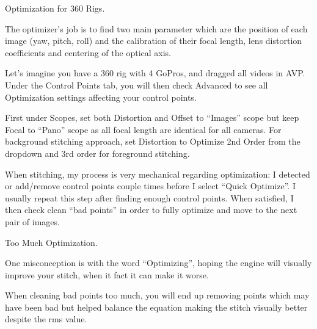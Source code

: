 \begin{fullwidth}
\clearpage
{\large Optimization for 360 Rigs. \par}

The optimizer’s job is to find two main parameter which are the position of each image (yaw, pitch, roll) and the calibration of their focal length, lens distortion coefficients and centering of the optical axis. 


Let’s imagine you have a 360 rig with 4 GoPros, and dragged all videos in AVP. Under the Control Points tab, you will then check Advanced to see all Optimization settings affecting your control points.


First under Scopes, set both Distortion and Offset to “Images” scope but keep Focal to “Pano” scope as all focal length are identical for all cameras. For background stitching approach, set Distortion to Optimize 2nd Order from the dropdown and 3rd order for foreground stitching.


When stitching, my process is very mechanical regarding optimization: I detected or add/remove control points couple times before I select “Quick Optimize”. I usually repeat this step after finding enough control points. When satisfied, I then check clean “bad points” in order to fully optimize and move to the next pair of images.


{\large Too Much Optimization. \par}

One misconception is with the word “Optimizing”, hoping the engine will visually improve your stitch, when it fact it can make it worse.

When cleaning bad points too much, you will end up removing points which may have been bad but helped balance the equation making the stitch visually better despite the rms value.


\clearpage
\end{fullwidth}
